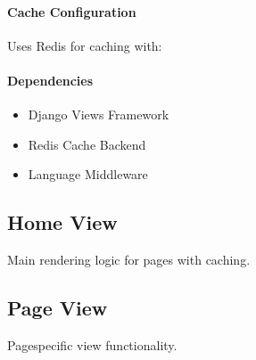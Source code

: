 \documentclass[letterpaper,10pt,english]{sphinxmanual}
\begin{document}
\paragraph{Cache Configuration}
\label{\detokenize{views/page:cache-configuration}}
\sphinxAtStartPar
Uses Redis for caching with:

\begin{sphinxVerbatim}[commandchars=\\\{\}]
  
     
         
         
         
             
\end{sphinxVerbatim}


\paragraph{Dependencies}
\label{\detokenize{views/page:dependencies}}\begin{itemize}
\item {} 
\sphinxAtStartPar
Django Views Framework

\item {} 
\sphinxAtStartPar
Redis Cache Backend

\item {} 
\sphinxAtStartPar
Language Middleware

\end{itemize}


\subsection{Home View}
\label{\detokenize{views/index:home-view}}
\sphinxAtStartPar
Main rendering logic for pages with caching.


\subsection{Page View}
\label{\detokenize{views/index:page-view}}
\sphinxAtStartPar
Page\sphinxhyphen{}specific view functionality.
\end{document}
